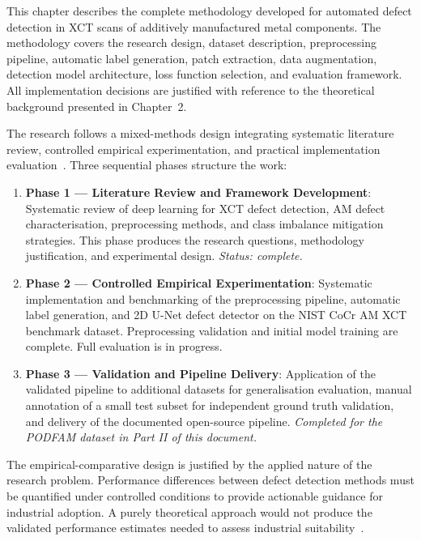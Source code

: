 
This chapter describes the complete methodology developed for automated defect detection in XCT
scans of additively manufactured metal components. The methodology covers the research design,
dataset description, preprocessing pipeline, automatic label generation, patch extraction, data
augmentation, detection model architecture, loss function selection, and evaluation framework. All
implementation decisions are justified with reference to the theoretical background presented in
Chapter~2.

The research follows a mixed-methods design integrating systematic literature review, controlled
empirical experimentation, and practical implementation evaluation~\citep{Creswell2014}. Three
sequential phases structure the work:
\begin{enumerate}
\item \textbf{Phase 1 --- Literature Review and Framework Development}: Systematic review of deep
  learning for XCT defect detection, AM defect characterisation, preprocessing methods, and class
  imbalance mitigation strategies. This phase produces the research questions, methodology
  justification, and experimental design. \emph{Status: complete.}
\item \textbf{Phase 2 --- Controlled Empirical Experimentation}: Systematic implementation and
  benchmarking of the preprocessing pipeline, automatic label generation, and 2D U-Net defect
  detector on the NIST CoCr AM XCT benchmark dataset. Preprocessing validation and initial model
  training are complete. Full evaluation is in progress.
\item \textbf{Phase 3 --- Validation and Pipeline Delivery}: Application of the validated pipeline
  to additional datasets for generalisation evaluation, manual annotation of a small test subset for
  independent ground truth validation, and delivery of the documented open-source pipeline.
  \emph{Completed for the PODFAM dataset in Part II of this document.}
\end{enumerate}
The empirical-comparative design is justified by the applied nature of the research problem.
Performance differences between defect detection methods must be quantified under controlled
conditions to provide actionable guidance for industrial adoption. A purely theoretical approach
would not produce the validated performance estimates needed to assess industrial
suitability~\citep{Creswell2014}.

